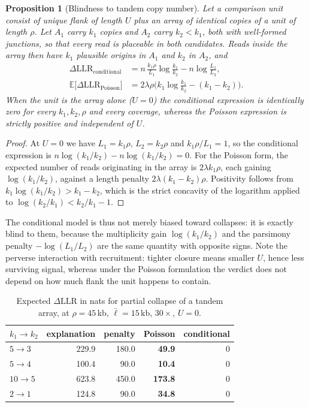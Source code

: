 \documentclass[11pt]{article}
\newtheorem{proposition}{Proposition}
\begin{document}
\begin{proposition}[Blindness to tandem copy number]
\label{prop:array}
Let a comparison unit consist of unique flank of length $U$ plus an array of
identical copies of a unit of length $\rho$.  Let $A_1$ carry $k_1$ copies and
$A_2$ carry $k_2 < k_1$, both with well-formed junctions, so that every read is
placeable in both candidates.  Reads inside the array then have $k_1$ plausible
origins in $A_1$ and $k_2$ in $A_2$, and
\begin{align}
    \Delta\mathrm{LLR}_{\text{conditional}}
      &= n\,\frac{k_1\rho}{L_1}\log\frac{k_1}{k_2}
       - n\log\frac{L_1}{L_2},\\
    \mathbb{E}\big[\Delta\mathrm{LLR}_{\text{Poisson}}\big]
      &= 2\lambda\rho\Big(k_1\log\frac{k_1}{k_2} - (k_1-k_2)\Big).
\end{align}
When the unit is the array alone ($U=0$) the conditional expression is
identically zero for every $k_1, k_2, \rho$ and every coverage, whereas the
Poisson expression is strictly positive and independent of $U$.
\end{proposition}

\begin{proof}
At $U=0$ we have $L_1 = k_1\rho$, $L_2 = k_2\rho$ and $k_1\rho/L_1 = 1$, so the
conditional expression is $n\log(k_1/k_2) - n\log(k_1/k_2) = 0$.  For the
Poisson form, the expected number of reads originating in the array is
$2\lambda k_1\rho$, each gaining $\log(k_1/k_2)$, against a length penalty
$2\lambda(k_1-k_2)\rho$.  Positivity follows from
$k_1\log(k_1/k_2) > k_1-k_2$, which is the strict concavity of the logarithm
applied to $\log(k_2/k_1) < k_2/k_1 - 1$.
\end{proof}

The conditional model is thus not merely biased toward collapses: it is exactly
blind to them, because the multiplicity gain $\log(k_1/k_2)$ and the parsimony
penalty $-\log(L_1/L_2)$ are the same quantity with opposite signs.  Note the
perverse interaction with recruitment: tighter closure means smaller $U$, hence
less surviving signal, whereas under the Poisson formulation the verdict does
not depend on how much flank the unit happens to contain.

\begin{table}[t]
\centering
\small
\begin{tabular}{lrrrr}
\toprule
$k_1 \to k_2$ & explanation & penalty & Poisson & conditional \\
\midrule
$5 \to 3$  & 229.9 & 180.0 & \textbf{49.9}  & 0 \\
$5 \to 4$  & 100.4 &  90.0 & \textbf{10.4}  & 0 \\
$10 \to 5$ & 623.8 & 450.0 & \textbf{173.8} & 0 \\
$2 \to 1$  & 124.8 &  90.0 & \textbf{34.8}  & 0 \\
\bottomrule
\end{tabular}
\caption{Expected $\Delta\mathrm{LLR}$ in nats for partial collapse of a
tandem array, at $\rho = 45$\,kb, $\bar\ell = 15$\,kb, $30\times$, $U=0$.}
\label{tab:collapse}
\end{table}
\end{document}
